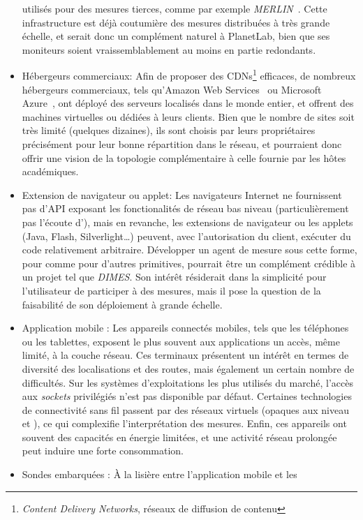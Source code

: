 \begin{itemize}
  utilisés pour des mesures tierces, comme par exemple {\em
  MERLIN}~\cite{merlin}. Cette infrastructure est déjà coutumière des mesures
  distribuées à très grande échelle, et serait donc un complément naturel à
  PlanetLab, bien que ses moniteurs soient vraissemblablement au moins en partie
  redondants.
  \item Hébergeurs commerciaux: Afin de proposer des CDNs\footnote{{\em
  Content Delivery Networks}, réseaux de diffusion de contenu} efficaces, de
  nombreux hébergeurs commerciaux, tels qu'Amazon Web Services~\cite{aws} ou
  Microsoft Azure~\cite{msazure}, ont déployé des serveurs localisés dans le
  monde entier, et offrent des machines virtuelles ou dédiées à leurs clients.
  Bien que le nombre de sites soit très limité (quelques dizaines), ils sont
  choisis par leurs propriétaires précisément pour leur bonne répartition dans
  le réseau, et pourraient donc offrir une vision de la topologie complémentaire
  à celle fournie par les hôtes académiques.
  \item Extension de navigateur ou applet: Les navigateurs Internet ne
  fournissent pas d'API exposant les fonctionalités de réseau bas niveau
  (particulièrement pas l'écoute d'\icmp), mais en revanche, les extensions de
  navigateur ou les applets (Java, Flash, Silverlight\ldots) peuvent, avec
  l'autorisation du client, exécuter du code relativement arbitraire. Développer
  un agent de mesure sous cette forme, pour \udpping comme pour d'autres
  primitives, pourrait être un complément crédible à un projet tel que {\em
  DIMES}. Son intérêt résiderait dans la simplicité pour l'utilisateur de
  participer à des mesures, mais il pose la question de la faisabilité de son
  déploiement à grande échelle.
  \item Application mobile : Les appareils connectés mobiles, tels que
  les téléphones ou les tablettes, exposent le plus souvent aux applications un
  accès, même limité, à la couche réseau. Ces terminaux présentent un intérêt en
  termes de diversité des localisations et des routes, mais également un certain
  nombre de difficultés. Sur les systèmes d'exploitations les plus utilisés du
  marché, l'accès aux {\em sockets} privilégiés n'est pas disponible par défaut.
  Certaines technologies de connectivité sans fil passent par des réseaux
  virtuels (opaques aux niveau \LL et \LLL), ce qui complexifie l'interprétation
  des mesures. Enfin, ces appareils ont souvent des capacités en énergie
  limitées, et une activité réseau prolongée peut induire une forte
  consommation.
  \item Sondes embarquées : À la lisière entre l'application mobile et les

\end{itemize}
